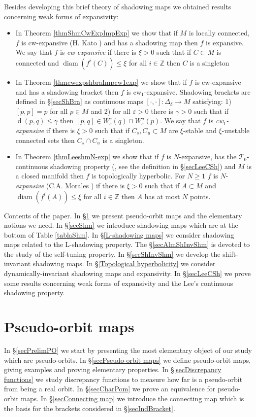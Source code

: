 \documentclass[12pt]{amsart}
\theoremstyle{plain}
\theoremstyle{definition}
\theoremstyle{remark}
\DeclareMathOperator{\diam}{diam}
\DeclareMathOperator{\dist}{d}
\newcommand{\Z}{\mathbb Z}
\renewcommand{\epsilon}{\varepsilon}
\newcommand{\expc}{\xi}
\begin{document}
Besides developing this brief theory of shadowing maps we obtained results concerning weak forms of expansivity:
\begin{itemize}
	\item In Theorem \ref{thmShmCwExpImpExp} we show that
	if $M$ is locally connected, $f$ is cw-expansive (H. Kato \cite{Kato93}) and has a shadowing map then $f$ is expansive. We say that $f$ is \textit{cw-expansive} if there is $\expc>0$ such that if $C\subset M$ is connected and $\diam(f^i(C))\leq\expc$ for all $i\in\Z$ then $C$ is a singleton

	\item In Theorem \ref{thmcwexpshbraImpcw1exp} we show that
	if $f$ is cw-expansive and has a shadowing bracket then $f$ is cw$_1$-expansive.
	Shadowing brackets are defined in \S\ref{secShBra} as continuous maps
	$[\cdot,\cdot]\colon \Delta_\delta\to M$
	satisfying: 1) $[p,p]=p$ for all $p\in M$ and
	2) for all $\epsilon>0$ there is $\gamma>0$ such that if
	$\dist(p,q)\leq\gamma$ then $[p,q]\in W^s_\epsilon(q)\cap W^u_\epsilon(p).$
	We say that $f$ is \textit{cw$_1$-expansive} if there is $\expc>0$ such that if
	$C_s,C_u\subset M$ are $\expc$-stable and $\expc$-unstable connected sets then $C_s\cap C_u$ is a singleton.
	\item In Theorem \ref{thmLeeshmN-exp} we show
	that if $f$ is $N$-expansive, has the $\mathcal{T}_0$-continuous shadowing property (\cite{Lee03}, see the definition in \S\ref{secLeeCSh}) and $M$ is a closed manifold then
	$f$ is topologically hyperbolic.
	For $N\geq 1$ $f$ is $N$-\textit{expansive} (C.A. Morales \cite{Morales2012}) if there is $\expc>0$ such that if $A\subset M$ and
	$\diam(f^i(A))\leq\expc$ for all $i\in\Z$ then $A$ has
	at most $N$ points.
\end{itemize}

Contents of the paper.
In \S\ref{secPOM} we present pseudo-orbit maps and the elementary notions we need.
In \S\ref{secShm} we introduce shadowing maps which are at the bottom of Table \ref{tablaShm}.
In \S\ref{L-shadowing maps} we consider shadowing maps related to the L-shadowing property.
The \S\ref{secAlmShInvShm} is devoted to the study of the self-tuning property.
In \S\ref{secShInvShm} we develop the shift-invariant shadowing maps.
In \S\ref{Topological hyperbolicity} we consider dynamically-invariant shadowing maps and expansivity.
In \S\ref{secLeeCSh} we prove some results concerning weak forms of expansivity and the Lee's continuous shadowing property.

\section{Pseudo-orbit maps}
\label{secPOM}
In \S\ref{secPrelimPO} we start by presenting the most elementary object of our study which are pseudo-orbits.
In \S\ref{secPseudo-orbit maps} we define pseudo-orbit maps, giving examples and proving elementary properties.
In \S\ref{secDiscrepancy functions} we study discrepancy functions to measure how far is a pseudo-orbit from being a real orbit.
In \S\ref{secCharPom} we prove an equivalence for pseudo-orbit maps.
In \S\ref{secConnecting map} we introduce the connecting map which is the basis for the brackets considered in \S\ref{secIndBracket}.
\end{document}
